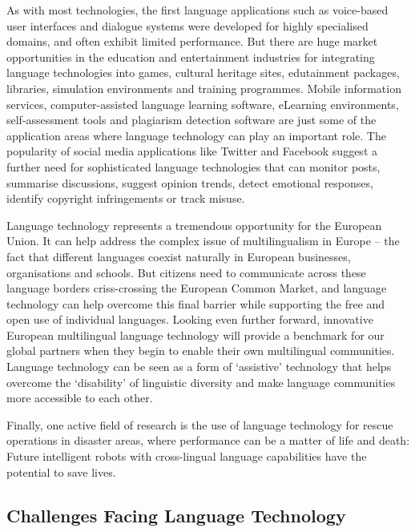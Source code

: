 \begin{multicols}{2}
As with most technologies, the first language applications such as voice-based user interfaces and dialogue systems were developed for highly specialised domains, and often exhibit limited performance. But there are huge market opportunities in the education and entertainment industries for integrating language technologies into games, cultural heritage sites, edutainment packages, libraries, simulation environments and training programmes. Mobile information services, computer-assisted language learning software, eLearning environments, self-assessment tools and plagiarism detection software are just some of the application areas where language technology can play an important role. The popularity of social media applications like Twitter and Facebook suggest a further need for sophisticated language technologies that can monitor posts, summarise discussions, suggest opinion trends, detect emotional responses, identify copyright infringements or track misuse.


Language technology represents a tremendous opportunity for the European Union. It can help address the complex issue of multilingualism in Europe – the fact that different languages coexist naturally in European businesses, organisations and schools. But citizens need to communicate across these language borders criss-crossing the European Common Market, and language technology can help overcome this final barrier while supporting the free and open use of individual languages. Looking even further forward, innovative European multilingual language technology will provide a benchmark for our global partners when they begin to enable their own multilingual communities. Language technology can be seen as a form of ‘assistive’ technology that helps overcome the ‘disability’ of linguistic diversity and make language communities more accessible to each other.

Finally, one active field of research is the use of language technology for rescue operations in disaster areas, where performance can be a matter of life and death: Future intelligent robots with cross-lingual language capabilities have the potential to save lives.

\subsection{Challenges Facing Language Technology}


\end{multicols}
